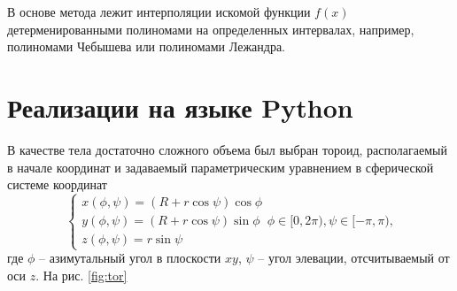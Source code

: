 В основе метода лежит интерполяции искомой функции $f(x)$ детерменированными
полиномами на определенных интервалах, например, полиномами Чебышева или
полиномами Лежандра. 


\section{Реализации на языке Python}

В качестве тела достаточно сложного объема был выбран тороид, располагаемый в
начале координат и задаваемый параметрическим уравнением в сферической системе
координат
\begin{equation}
    \label{eq:tor}
    \begin{cases}
        x(\phi, \psi) = (R + r\cos \psi) \cos \phi \\
        y(\phi, \psi) = (R + r\cos \psi) \sin \phi \\
        z(\phi, \psi) = r\sin \psi
    \end{cases}
    \phi \in [0, 2\pi), \psi \in [-\pi, \pi),
\end{equation}
где $\phi$ -- азимутальный угол в плоскости  $xy$,  $\psi$ -- угол элевации,
отсчитываемый от оси $z$. На рис. \ref{fig:tor}
